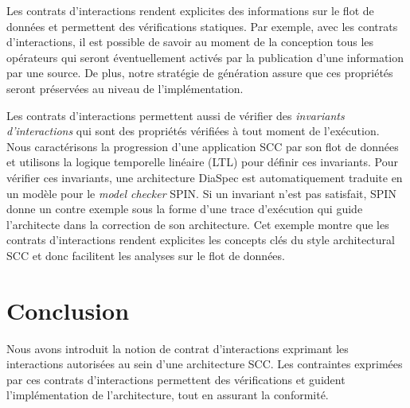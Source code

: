 \documentclass{llncs}
\begin{document}
Les contrats d'interactions rendent explicites des informations sur le
flot de données et permettent des vérifications statiques. Par
exemple, avec les contrats d'interactions, il est possible de savoir
au moment de la conception tous les opérateurs qui seront
éventuellement activés par la publication d'une information par une
source. De plus, notre stratégie de génération assure que ces
propriétés seront préservées au niveau de l'implémentation.

Les contrats d'interactions permettent aussi de vérifier des
\emph{invariants d'interactions} qui sont des propriétés vérifiées à
tout moment de l'exécution. Nous caractérisons la progression d'une
application SCC par son flot de données et utilisons la logique
temporelle linéaire (LTL) pour définir ces invariants. Pour vérifier
ces invariants, une architecture DiaSpec est automatiquement traduite
en un modèle pour le \emph{model checker} SPIN. Si un invariant n'est
pas satisfait, SPIN donne un contre exemple sous la forme d'une trace
d'exécution qui guide l'architecte dans la correction de son
architecture. Cet exemple montre que les contrats d'interactions
rendent explicites les concepts clés du style architectural SCC et
donc facilitent les analyses sur le flot de données.

\section{Conclusion}

Nous avons introduit la notion de contrat d'interactions exprimant les
interactions autorisées au sein d'une architecture SCC. Les contraintes
exprimées par ces contrats d'interactions permettent des vérifications et
guident l'implémentation de l'architecture, tout en assurant la conformité.
\end{document}
